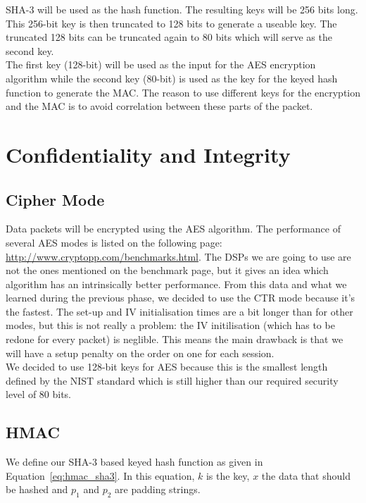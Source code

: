 \documentclass[a4paper]{article}
\begin{document}
SHA-3 will be used as the hash function. The resulting keys will be 256 bits long. This 256-bit key is then truncated to 128 bits to generate a useable key. The truncated 128 bits can be truncated again to 80 bits which will serve as the second key.\\

The first key (128-bit) will be used as the input for the AES encryption algorithm while the second key (80-bit) is used as the key for the keyed hash function to generate the MAC. The reason to use different keys for the encryption and the MAC is to avoid correlation between these parts of the packet.

\section{Confidentiality and Integrity}

\subsection{Cipher Mode}

Data packets will be encrypted using the AES algorithm. The performance of several AES modes is listed on the following page: \url{http://www.cryptopp.com/benchmarks.html}. The DSPs we are going to use are not the ones mentioned on the benchmark page, but it gives an idea which algorithm has an intrinsically better performance. From this data and what we learned during the previous phase, we decided to use the CTR mode because it's the fastest. The set-up and IV initialisation times are a bit longer than for other modes, but this is not really a problem: the IV initilisation (which has to be redone for every packet) is neglible. This means the main drawback is that we will have a setup penalty on the order on one {\micro\second} for each session.\\

We decided to use 128-bit keys for AES because this is the smallest length defined by the NIST standard which is still higher than our required security level of 80 bits.

\subsection{HMAC}

We define our SHA-3 based keyed hash function as given in Equation~\ref{eq:hmac_sha3}. In this equation, $k$ is the key, $x$ the data that should be hashed and $p_1$ and $p_2$ are padding strings.
\end{document}
